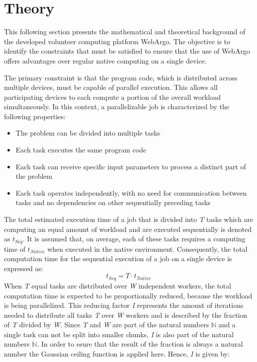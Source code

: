 \section{Theory}
\label{sec:concept:theory}
This following section presents the mathematical and theoretical background of the developed volunteer computing platform WebArgo. The objective is to identify the constraints that must be satisfied to ensure that the use of WebArgo offers advantages over regular native computing on a single device.

The primary constraint is that the program code, which is distributed across multiple devices, must be capable of parallel execution. This allows all participating devices to each compute a portion of the overall workload simultaneously. In this context, a parallelizable job is characterized by the following properties:
\begin{itemize}
  \item The problem can be divided into multiple tasks
  \item Each task executes the same program code
  \item Each task can receive specific input parameters to process a distinct part of the problem
  \item Each task operates independently, with no need for communication between tasks and no dependencies on other sequentially preceding tasks
\end{itemize}
The total estimated execution time of a job that is divided into \emph{T} tasks which are computing an equal amount of workload and are executed sequentially is denoted as $t_{Seq}$. It is assumed that, on average, each of these tasks requires a computing time of $t_{Native}$ when executed in the native environment. Consequently, the total computation time for the sequential execution of a job on a single device is expressed as:
\begin{equation}
  t_{Seq} = T \cdot t_{Native}
  \label{equ:single}
\end{equation}
When \emph{T} equal tasks are distributed over \emph{W} independent workers, the total computation time is expected to be proportionally reduced, because the workload is being parallelized. This reducing factor \emph{I} represents the amount of iterations needed to distribute all tasks \emph{T} over \emph{W} workers and is described by the fraction of \emph{T} divided by \emph{W}. Since \emph{T} and \emph{W} are part of the natural numbers $\mathbb{N}$ and a single task can not be split into smaller chunks, \emph{I} is also part of the natural numbers $\mathbb{N}$. In order to esure that the result of the fraction is always a natural number the Gaussian ceiling function is applied here. Hence, \emph{I} is given by: 
